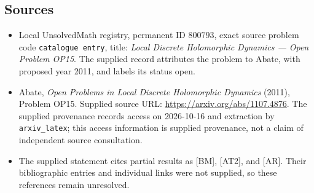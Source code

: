 \documentclass[11pt]{article}
\begin{document}
\subsection{Sources}
\begin{itemize}
\item Local UnsolvedMath registry, permanent ID \(800793\), exact source problem code \texttt{catalogue entry}, title: \emph{Local Discrete Holomorphic Dynamics --- Open Problem OP15}. The supplied record attributes the problem to Abate, with proposed year 2011, and labels its status open.
\item Abate, \emph{Open Problems in Local Discrete Holomorphic Dynamics} (2011), Problem OP15. Supplied source URL: \url{https://arxiv.org/abs/1107.4876}. The supplied provenance records access on 2026-10-16 and extraction by \texttt{arxiv\_latex}; this access information is supplied provenance, not a claim of independent source consultation.
\item The supplied statement cites partial results as [BM], [AT2], and [AR]. Their bibliographic entries and individual links were not supplied, so these references remain unresolved.
\end{itemize}
\end{document}
